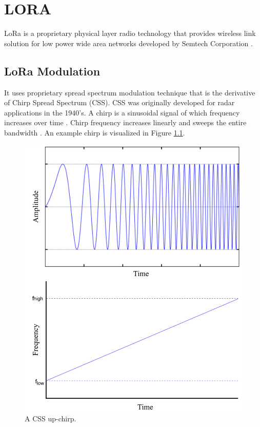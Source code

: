 \chapter{LORA}\label{ch:lora_lorawan}

LoRa is a proprietary physical layer radio technology that provides wireless link solution for low power wide area networks developed by Semtech Corporation \cite{semtech}.

\section{LoRa Modulation}

It uses proprietary spread spectrum modulation technique that is the derivative of Chirp Spread Spectrum (CSS). CSS was originally developed for radar applications in the 1940’s. A chirp is a sinusoidal signal of which frequency increases over time \cite{1091721}. Chirp frequency increases linearly and sweeps the entire bandwidth \cite{AN1200.22}. An example chirp is visualized in Figure \ref{fig:lora_chirp}.

\begin{figure}[h]
\centering
\includegraphics[width=.7\linewidth]{fig/lora_chirp.png}
\vspace*{5mm}
\caption{A CSS up-chirp. \cite{sghoslya_lora}}
\label{fig:lora_chirp}
\end{figure}

